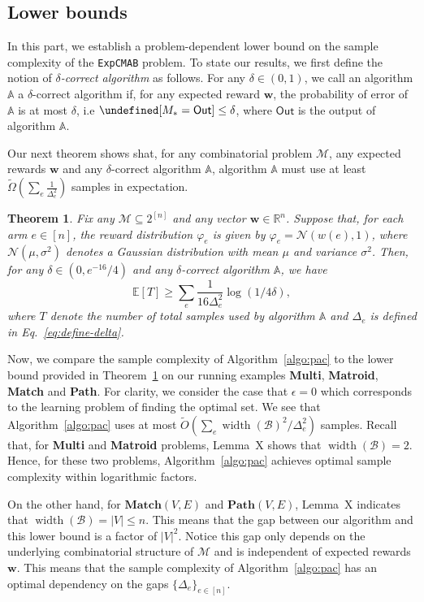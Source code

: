 \documentclass{article}
\newtheorem{theorem}{Theorem}
\newcommand{\Problem}{\texttt{ExpCMAB}\xspace}
\newcommand{\Rew}{\varphi}
\newcommand{\E}{\mathbb E}
\newcommand{\M}{\mathcal M}
\newcommand{\B}{\mathcal B}
\newcommand{\RR}{\mathbb R}
\DeclareMathOperator{\rank}{width}
\newcommand{\out}{\mathsf{Out}}
\let\Pr\undefined
\DeclareMathOperator{\Pr}{Pr}
\newcommand{\MultiIdent}{\textbf{Multi}\xspace}
\newcommand{\Matroid}{\textbf{Matroid}\xspace}
\newcommand{\Match}{\textbf{Match}\xspace}
\newcommand{\Path}{\textbf{Path}\xspace}
\renewcommand{\vec}[1]{\boldsymbol{#1}}
\begin{document}
\begin{spacing}{1.1}
\section{Lower bounds}

In this part, we establish a problem-dependent lower bound on the sample complexity of the \Problem problem. 
To state our results, we first define the notion of \emph{$\delta$-correct algorithm} as follows.
For any $\delta \in (0,1)$, we call an algorithm $\mathbb A$ a $\delta$-correct algorithm if, for any expected reward $\vec w$, the probability of error of $\mathbb A$ is at most $\delta$, i.e $\Pr[M_*=\out] \le \delta$, where $\out$ is the output of algorithm $\mathbb A$.

Our next theorem shows shat, for any combinatorial problem $\M$, any expected rewards $\vec w$ and any $\delta$-correct algorithm $\mathbb A$, algorithm $\mathbb A$ must use at least $\tilde\Omega\left(\sum_{e} \frac{1}{\Delta_e^2}\right)$ samples in expectation.

\begin{theorem}
Fix any $\M\subseteq 2^{[n]}$ and any vector $\vec w \in \RR^n$.
Suppose that, for each arm $e\in [n]$, the reward distribution $\Rew_e$ is given by $\Rew_e=\mathcal N(w(e),1)$, where $\mathcal N(\mu, \sigma^2)$ denotes a Gaussian distribution with mean $\mu$ and variance $\sigma^2$. 
Then, for any $\delta \in (0,e^{-16}/4)$ and any $\delta$-correct algorithm $\mathbb A$, we have
$$
\E[T] \ge \sum_e \frac{1}{16\Delta_e^2}\log(1/4\delta),
$$
where 
$T$ denote the number of total samples used by algorithm $\mathbb A$ and
$\Delta_e$ is defined in Eq.~\eqref{eq:define-delta}.
\label{theorem:lower-bound}
\end{theorem}

Now, we compare the sample complexity of Algorithm~\ref{algo:pac} to the lower bound provided in Theorem~\ref{theorem:lower-bound} on our running examples \MultiIdent, \Matroid, \Match and \Path.
For clarity, we consider the case that $\epsilon=0$ which corresponds to the learning problem of finding the optimal set.
We see that Algorithm~\ref{algo:pac} uses at most $\tilde O(\sum_{e} \rank(\B)^2/\Delta_e^2)$ samples.
Recall that, for \MultiIdent and \Matroid problems, Lemma~X shows that $\rank(\B)=2$.
Hence, for these two problems, Algorithm~\ref{algo:pac} achieves optimal sample complexity within logarithmic factors.

On the other hand, for $\Match(V,E)$ and $\Path(V,E)$, Lemma~X indicates that $\rank(\B)=|V| \le n$.
This means that the gap between our algorithm and this lower bound is a factor of $|V|^2$.
Notice this gap only depends on the underlying combinatorial structure of $\M$ and is independent of expected rewards $\vec w$. 
This means that  the sample complexity of Algorithm~\ref{algo:pac} has an optimal dependency on the gaps $\{\Delta_e\}_{e\in[n]}$.


\end{spacing}
\end{document}
